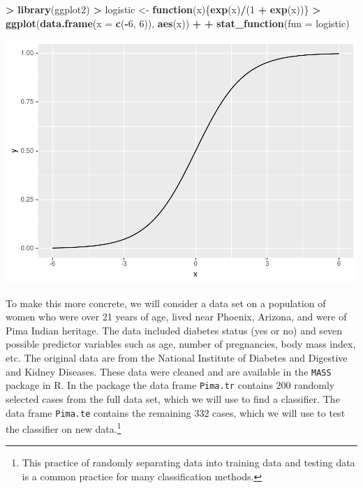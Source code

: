 \documentclass[
]{krantz}
\makeatletter
\newenvironment{Shaded}{\begin{snugshade}}{\end{snugshade}}
\newcommand{\ControlFlowTok}[1]{\textcolor[rgb]{0.27,0.27,0.27}{\textbf{#1}}}
\newcommand{\DataTypeTok}[1]{\textcolor[rgb]{0.27,0.27,0.27}{#1}}
\newcommand{\DecValTok}[1]{\textcolor[rgb]{0.06,0.06,0.06}{#1}}
\newcommand{\KeywordTok}[1]{\textcolor[rgb]{0.27,0.27,0.27}{\textbf{#1}}}
\newcommand{\NormalTok}[1]{#1}
\newcommand{\OperatorTok}[1]{\textcolor[rgb]{0.43,0.43,0.43}{\textbf{#1}}}
\newcommand{\StringTok}[1]{\textcolor[rgb]{0.5,0.5,0.5}{#1}}
\newenvironment{kframe}{%
\medskip{}
\setlength{\fboxsep}{.8em}
 \def\at@end@of@kframe{}%
 \ifinner\ifhmode%
  \def\at@end@of@kframe{\end{minipage}}%
  \begin{minipage}{\columnwidth}%
 \fi\fi%
 \def\FrameCommand##1{\hskip\@totalleftmargin \hskip-\fboxsep
 \colorbox{shadecolor}{##1}\hskip-\fboxsep
     \hskip-\linewidth \hskip-\@totalleftmargin \hskip\columnwidth}%
 \MakeFramed {\advance\hsize-\width
   \@totalleftmargin\z@ \linewidth\hsize
   \@setminipage}}%
 {\par\unskip\endMakeFramed%
 \at@end@of@kframe}
\renewenvironment{Shaded}{\begin{kframe}}{\end{kframe}}
\makeatother
\begin{document}
\begin{Shaded}
\begin{Highlighting}[]
\OperatorTok{\textgreater{}}\StringTok{ }\KeywordTok{library}\NormalTok{(ggplot2)}
\OperatorTok{\textgreater{}}\StringTok{ }\NormalTok{logistic \textless{}{-}}\StringTok{ }\ControlFlowTok{function}\NormalTok{(x)\{}\KeywordTok{exp}\NormalTok{(x)}\OperatorTok{/}\NormalTok{(}\DecValTok{1} \OperatorTok{+}\StringTok{ }\KeywordTok{exp}\NormalTok{(x))\}}
\OperatorTok{\textgreater{}}\StringTok{ }\KeywordTok{ggplot}\NormalTok{(}\KeywordTok{data.frame}\NormalTok{(}\DataTypeTok{x =} \KeywordTok{c}\NormalTok{(}\OperatorTok{{-}}\DecValTok{6}\NormalTok{, }\DecValTok{6}\NormalTok{)), }\KeywordTok{aes}\NormalTok{(x)) }\OperatorTok{+}
\OperatorTok{+}\StringTok{   }\KeywordTok{stat\_function}\NormalTok{(}\DataTypeTok{fun =}\NormalTok{ logistic)}
\end{Highlighting}
\end{Shaded}

\includegraphics{bookdown_files/figure-latex/unnamed-chunk-234-1.pdf}

To make this more concrete, we will consider a data set on a population of women who were over 21 years of age, lived near Phoenix, Arizona, and were of Pima Indian heritage. The data included diabetes status (yes or no) and seven possible predictor variables such as age, number of pregnancies, body mass index, etc. The original data are from the National Institute of Diabetes and Digestive and Kidney Diseases. These data were cleaned and are available in the \texttt{MASS} package in R. In the package the data frame \texttt{Pima.tr} contains 200 randomly selected cases from the full data set, which we will use to find a classifier. The data frame \texttt{Pima.te} contains the remaining 332 cases, which we will use to test the classifier on new data.\footnote{This practice of randomly separating data into training data and testing data is a common practice for many classification methods.}
\end{document}

